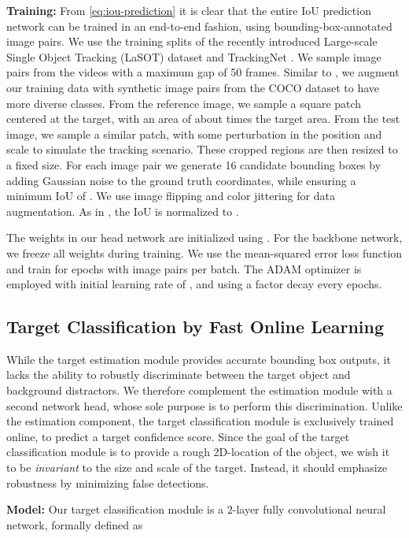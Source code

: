 \documentclass[10pt,twocolumn,letterpaper]{article}
\newcommand{\parsection}[1]{\noindent\textbf{#1:} }
\begin{document}
\parsection{Training}
From \eqref{eq:iou-prediction} it is clear that the entire IoU prediction network can be trained in an end-to-end fashion, using bounding-box-annotated image pairs. 
We use the training splits of the recently introduced Large-scale Single Object Tracking (LaSOT) dataset \cite{LaSOT} and TrackingNet \cite{TrackingNet}. We sample image pairs from the videos with a maximum gap of 50 frames. Similar to \cite{DaSiamRPN}, we augment our training data with synthetic image pairs from the COCO dataset \cite{COCO} to have more diverse classes. From the reference image, we sample a square patch centered at the target, with an area of about  times the target area. From the test image, we sample a similar patch, with some perturbation in the position and scale to simulate the tracking scenario. These cropped regions are then resized to a fixed size. For each image pair we generate 16 candidate bounding boxes by adding Gaussian noise to the ground truth coordinates, while ensuring a minimum IoU of . We use image flipping and color jittering for data augmentation. As in \cite{IOUNet}, the IoU is normalized to .

The weights in our head network are initialized using \cite{KaimingInit}. For the backbone network, we freeze all weights during training.  We use the mean-squared error loss function and train for  epochs with  image pairs per batch. The ADAM \cite{ADAM} optimizer is employed with initial learning rate of , and using a factor  decay every  epochs.


\subsection{Target Classification by Fast Online Learning}
\label{sec:target-classification}

While the target estimation module provides accurate bounding box outputs, it lacks the ability to robustly discriminate between the target object and background distractors. We therefore complement the estimation module with a second network head, whose sole purpose is to perform this discrimination. Unlike the estimation component, the target classification module is exclusively trained online, to predict a target confidence score. Since the goal of the target classification module is to provide a rough 2D-location of the object, we wish it to be \emph{invariant} to the size and scale of the target. Instead, it should emphasize robustness by minimizing false detections.

\parsection{Model}
Our target classification module is a 2-layer fully convolutional neural network, formally defined as
\end{document}
